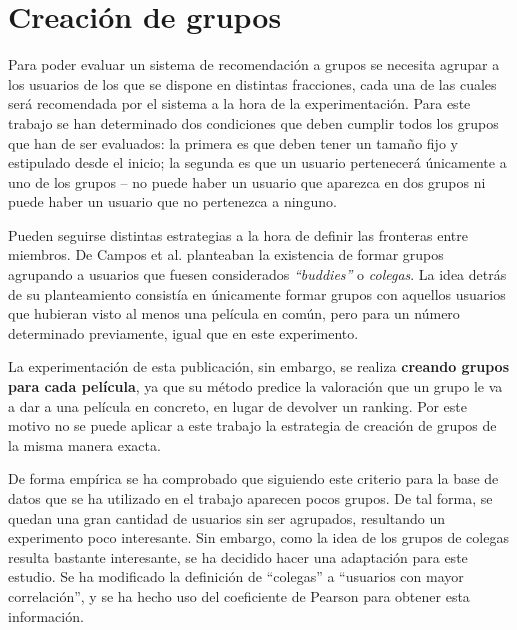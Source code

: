 \section{Creación de grupos}

Para poder evaluar un sistema de recomendación a grupos se necesita agrupar a los usuarios de los que se dispone en distintas fracciones, cada una de las cuales será recomendada por el sistema a la hora de la experimentación. Para este trabajo se han determinado dos condiciones que deben cumplir todos los grupos que han de ser evaluados: la primera es que deben tener un tamaño fijo y estipulado desde el inicio; la segunda es que un usuario pertenecerá únicamente a uno de los grupos -- no puede haber un usuario que aparezca en dos grupos ni puede haber un usuario que no pertenezca a ninguno.

Pueden seguirse distintas estrategias a la hora de definir las fronteras entre miembros. De Campos et al. \cite{umuai} planteaban la existencia de formar grupos agrupando a usuarios que fuesen considerados \textit{``buddies''} o \textit{colegas}. La idea detrás de su planteamiento consistía en únicamente formar grupos con aquellos usuarios que hubieran visto al menos una película en común, pero para un número determinado previamente, igual que en este experimento.

La experimentación de esta publicación, sin embargo, se realiza \textbf{creando grupos para cada película}, ya que su método predice la valoración que un grupo le va a dar a una película en concreto, en lugar de devolver un ranking. Por este motivo no se puede aplicar a este trabajo la estrategia de creación de grupos de la misma manera exacta.

De forma empírica se ha comprobado que siguiendo este criterio para la base de datos que se ha utilizado en el trabajo aparecen pocos grupos. De tal forma, se quedan una gran cantidad de usuarios sin ser agrupados, resultando un experimento poco interesante. Sin embargo, como la idea de los grupos de colegas resulta bastante interesante, se ha decidido hacer una adaptación para este estudio. Se ha modificado la definición de ``colegas'' a ``usuarios con mayor correlación'', y se ha hecho uso del coeficiente de Pearson para obtener esta información.


